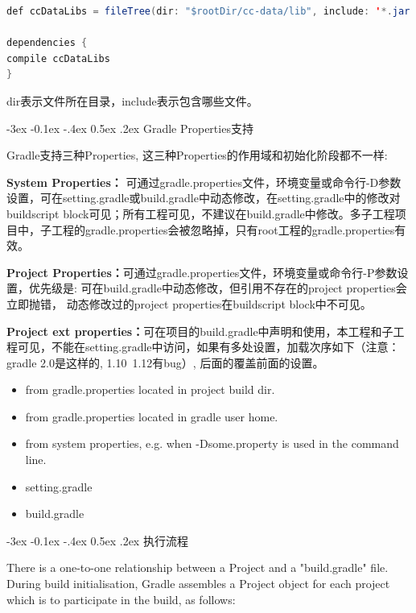 \documentclass[12pt]{book}
\makeatletter
\numberwithin{dummy}{section}
\theoremstyle{ocrenumbox}
\theoremstyle{blacknumex}
\theoremstyle{blacknumbox}
\theoremstyle{ocrenum}
\renewcommand{\subsection}{\@startsection {subsection}{2}{\z@}
	{-3ex \@plus -0.1ex \@minus -.4ex}
	{0.5ex \@plus.2ex }
	{\normalfont\sffamily\bfseries}}
\makeatother
\begin{document}
\begin{lstlisting}[language=Java]
def ccDataLibs = fileTree(dir: "$rootDir/cc-data/lib", include: '*.jar')

dependencies {
compile ccDataLibs
}
\end{lstlisting}

dir表示文件所在目录，include表示包含哪些文件。

\subsection{Gradle Properties支持}

Gradle支持三种Properties, 这三种Properties的作用域和初始化阶段都不一样:

\textbf{System Properties：}
可通过gradle.properties文件，环境变量或命令行-D参数设置，可在setting.gradle或build.gradle中动态修改，在setting.gradle中的修改对buildscript block可见；所有工程可见，不建议在build.gradle中修改。多子工程项目中，子工程的gradle.properties会被忽略掉，只有root工程的gradle.properties有效。

\textbf{Project Properties：}可通过gradle.properties文件，环境变量或命令行-P参数设置，优先级是:
可在build.gradle中动态修改，但引用不存在的project properties会立即抛错，
动态修改过的project properties在buildscript block中不可见。

\textbf{Project ext properties：}可在项目的build.gradle中声明和使用，本工程和子工程可见，不能在setting.gradle中访问，如果有多处设置，加载次序如下（注意：gradle 2.0是这样的, 1.10~1.12有bug）, 后面的覆盖前面的设置。

\begin{itemize}
	\item {from gradle.properties located in project build dir.}
	\item {from gradle.properties located in gradle user home.}
	\item {from system properties, e.g. when -Dsome.property is used in the command line.}
	\item {setting.gradle}
	\item {build.gradle}
\end{itemize}


\subsection{执行流程}

There is a one-to-one relationship between a Project and a "build.gradle" file. During build initialisation, Gradle assembles a Project object for each project which is to participate in the build, as follows:
\end{document}
